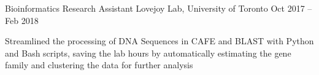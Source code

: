 \begin{cventries}
  \cventry
    {Bioinformatics Research Assistant}
    {Lovejoy Lab, University of Toronto}
    {}
    {Oct 2017 -- Feb 2018}
    {}
    {
      \begin{cvitems}
        \item {Streamlined the processing of DNA Sequences in CAFE and BLAST with Python and Bash scripts, saving the lab hours by automatically estimating the gene family and clustering the data for further analysis}
      \end{cvitems}
    }
\end{cventries}

